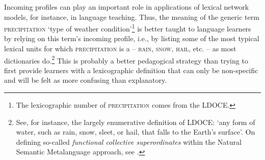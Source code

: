 Incoming profiles can play an important role in applications of lexical network models, for instance, in language teaching. Thus, the meaning of the generic term \textsc{precipitation} `type of weather condition'\footnote{The lexicographic number of \textsc{precipitation} comes from the LDOCE.} is better taught to language learners by relying on this term's incoming profile, i.e., by listing some of the most typical lexical units for which \textsc{precipitation} is a  -- \textsc{rain}, \textsc{snow}, \textsc{hail}, etc. -- as most dictionaries do.\footnote{See, for instance, the largely enumerative definition of LDOCE: `any form of water, such as rain, snow, sleet, or hail, that falls to the Earth's surface'. On defining so-called \textit{functional collective superordinates} within the Natural Semantic Metalanguage approach, see \textcite{Goddard2017}.} This is probably a better pedagogical strategy than trying to first provide learners with a lexicographic definition that can only be non-specific and will be felt as more confusing than explanatory.

